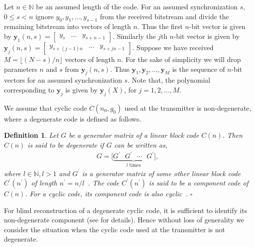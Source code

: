 \documentclass[10pt,journal]{IEEEtran}
\newtheorem{definition}{Definition}
\def \Fig {Fig.}
\begin{document}
% 
Let $n \in \mathbb{N}$ be an assumed length of the code.
For an assumed synchronization $s$, $0 \leq s < n$ ignore $y_0, y_1, \ldots , y_{s-1}$
from the received bitstream and divide the remaining bitstream into vectors of length $n$.
Thus the first $n$-bit vector is given by $\mathbf{y}_{1}(n,s) = \begin{bmatrix} y_s & \ldots & y_{s+n-1} \end{bmatrix}$.
Similarly the $j$th $n$-bit vector is given by $\mathbf{y}_{j}(n,s) = \begin{bmatrix} y_{s+(j-1)n} & \ldots & y_{s+jn-1}\end{bmatrix}$.
Suppose we have received $M = \lfloor (N-s)/n \rfloor$ vectors of length $n$. 
For the sake of simplicity we will drop parameters $n$ and $s$ from $\mathbf{y}_{j}(n,s)$.
Thus $\mathbf{y}_1, \mathbf{y}_2, \ldots, \mathbf{y}_M$ is the sequence of $n$-bit vectors
for an assumed synchronization $s$.
Note that, the polynomial corresponding to $\mathbf{y}_j$ is given by $\mathbf{y}_j(X)$, for $j = 1,2,\ldots, M$.

We assume that cyclic code $C(n_0,g_0)$ used at the transmitter is non-degenerate, where 
a degenerate code is defined as follows.
% 
\begin{definition}
\label{Definition_degerate}
% 
Let $G$ be a generator matrix of a linear block code $C(n)$.
Then $C(n)$ is said to be degenerate if $G$ can be written as,
% 
\begin{align}
%  
G =  \Big[\underbrace{G^{\prime} \mbox{~~} G^{\prime} \mbox{~~} \cdots \mbox{~~} G^{\prime}}_{l \text{ times}}\Big],
\label{Eqn_Definition_self_repetition_family}
% 
\end{align}
% 
where $l\in \mathbb{N}, l > 1$ and $G^{\prime}$ is a generator matrix of some other linear block code $C^{\prime}(n^{\prime})$
of length $n^{\prime} = n/l$~\cite[Ch.~8]{Macwilliams_Sloane_1977}.
The code $C^{\prime}(n^{\prime})$ is said to be a component code of $C(n)$.
For a cyclic code, its component code is also cyclic~\cite{TCOMM_2016}.
% 
\hfill $\square$
% 
\end{definition}
% 
For blind reconstruction of a degenerate cyclic code, it is sufficient to identify its 
non-degenerate component (see \cite{TCOMM_2016} for details).
Hence without loss of generality we consider the situation when the cyclic code used at the transmitter is not degenerate.
\end{document}
